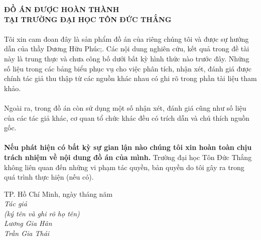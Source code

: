 \documentclass{article}
\begin{document}
	



	\begin{center}
		\fontsize{16}{20}\selectfont
		\textbf{ĐỒ ÁN ĐƯỢC HOÀN THÀNH}\\
		\textbf{TẠI TRƯỜNG ĐẠI HỌC TÔN ĐỨC THẮNG\\} 
	\end{center}
	\fontsize{13}{13}\selectfont
	\paragraph{}
	Tôi xin cam đoan đây là sản phẩm đồ án của riêng chúng tôi và được sự hướng dẫn của thầy Dương Hữu Phúc;. Các nội dung nghiên cứu, kết quả trong đề tài này là trung thực và chưa công bố dưới bất kỳ hình thức nào trước đây. Những số liệu trong các bảng biểu phục vụ cho việc phân tích, nhận xét, đánh giá được chính tác giả thu thập từ các nguồn khác nhau có ghi rõ trong phần tài liệu tham khảo.
	\paragraph{}
	Ngoài ra, trong đồ án còn sử dụng một số nhận xét, đánh giá cũng như số liệu của các tác giả khác, cơ quan tổ chức khác đều có trích dẫn và chú thích nguồn gốc.
	\paragraph{}
	\textbf{Nếu phát hiện có bất kỳ sự gian lận nào chúng tôi xin hoàn toàn chịu trách nhiệm về nội dung đồ án của mình.} Trường đại học Tôn Đức Thắng không liên quan đến những vi phạm tác quyền, bản quyền do tôi gây ra trong quá trình thực hiện (nếu có).
	\begin{flushright}
		TP. Hồ Chí Minh,  ngày   tháng   năm   \\ 
		\textit{Tác giả\\
			(ký tên và ghi rõ họ tên)\\
			\vspace{1.5cm}
			Lương Gia Hân\\
			\vspace{1.5cm}
			Trần Gia Thái\\
			\vspace{1.5cm}}
	\end{flushright}
	\pagebreak
	
\end{document}
